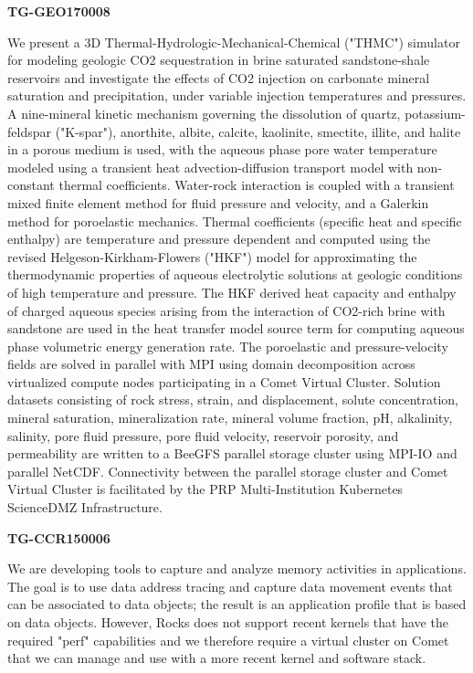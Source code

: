 \textbf{TG-GEO170008}

We present a 3D Thermal-Hydrologic-Mechanical-Chemical ("THMC")
simulator for modeling geologic CO2 sequestration in brine saturated
sandstone-shale reservoirs and investigate the effects of CO2 injection
on carbonate mineral saturation and precipitation, under variable
injection temperatures and pressures. A nine-mineral kinetic mechanism
governing the dissolution of quartz, potassium-feldspar ("K-spar"),
anorthite, albite, calcite, kaolinite, smectite, illite, and halite in a
porous medium is used, with the aqueous phase pore water temperature
modeled using a transient heat advection-diffusion transport model with
non-constant thermal coefficients. Water-rock interaction is coupled
with a transient mixed finite element method for fluid pressure and
velocity, and a Galerkin method for poroelastic mechanics. Thermal
coefficients (specific heat and specific enthalpy) are temperature and
pressure dependent and computed using the revised
Helgeson-Kirkham-Flowers ("HKF") model for approximating the
thermodynamic properties of aqueous electrolytic solutions at geologic
conditions of high temperature and pressure. The HKF derived heat
capacity and enthalpy of charged aqueous species arising from the
interaction of CO2-rich brine with sandstone are used in the heat
transfer model source term for computing aqueous phase volumetric energy
generation rate. The poroelastic and pressure-velocity fields are solved
in parallel with MPI using domain decomposition across virtualized
compute nodes participating in a Comet Virtual Cluster. Solution
datasets consisting of rock stress, strain, and displacement, solute
concentration, mineral saturation, mineralization rate, mineral volume
fraction, pH, alkalinity, salinity, pore fluid pressure, pore fluid
velocity, reservoir porosity, and permeability are written to a BeeGFS
parallel storage cluster using MPI-IO and parallel NetCDF. Connectivity
between the parallel storage cluster and Comet Virtual Cluster is
facilitated by the PRP Multi-Institution Kubernetes ScienceDMZ
Infrastructure.

\textbf{TG-CCR150006}

We are developing tools to capture and analyze memory activities in
applications. The goal is to use data address tracing and capture data
movement events that can be associated to data objects; the result is an
application profile that is based on data objects. However, Rocks does
not support recent kernels that have the required "perf" capabilities
and we therefore require a virtual cluster on Comet that we can manage
and use with a more recent kernel and software stack.

